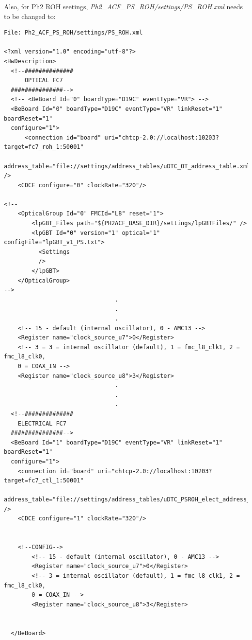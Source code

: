 \documentclass[10pt,a4paper]{article}
\begin{document}
\newpage

Also, for Ph2 ROH seetings, \emph{Ph2\_ACF\_PS\_ROH/settings/PS\_ROH.xml} needs to be changed to:

\begin{framed}
\begin{verbatim}
File: Ph2_ACF_PS_ROH/settings/PS_ROH.xml

<?xml version="1.0" encoding="utf-8"?>
<HwDescription>
  <!--##############
      OPTICAL FC7
  ###############-->
  <!-- <BeBoard Id="0" boardType="D19C" eventType="VR"> -->
  <BeBoard Id="0" boardType="D19C" eventType="VR" linkReset="1" boardReset="1"
  configure="1">
      <connection id="board" uri="chtcp-2.0://localhost:10203?target=fc7_roh_1:50001" 
      address_table="file://settings/address_tables/uDTC_OT_address_table.xml" />
    <CDCE configure="0" clockRate="320"/>

<!--
    <OpticalGroup Id="0" FMCId="L8" reset="1">
        <lpGBT_Files path="${PH2ACF_BASE_DIR}/settings/lpGBTFiles/" />
        <lpGBT Id="0" version="1" optical="1" configFile="lpGBT_v1_PS.txt">
          <Settings
          />
        </lpGBT>
    </OpticalGroup>
-->
                                .
                                .
                                .                                
    <!-- 15 - default (internal oscillator), 0 - AMC13 -->
    <Register name="clock_source_u7">0</Register>
    <!-- 3 = 3 = internal oscillator (default), 1 = fmc_l8_clk1, 2 = fmc_l8_clk0, 
    0 = COAX_IN -->
    <Register name="clock_source_u8">3</Register>   
                                .
                                .
                                .
  <!--##############
    ELECTRICAL FC7
  ###############-->
  <BeBoard Id="1" boardType="D19C" eventType="VR" linkReset="1" boardReset="1" 
  configure="1">
    <connection id="board" uri="chtcp-2.0://localhost:10203?target=fc7_ctl_1:50001" 
    address_table="file://settings/address_tables/uDTC_PSROH_elect_address_table.xml" />
    <CDCE configure="1" clockRate="320"/>


    <!--CONFIG-->
        <!-- 15 - default (internal oscillator), 0 - AMC13 -->
        <Register name="clock_source_u7">0</Register>
        <!-- 3 = internal oscillator (default), 1 = fmc_l8_clk1, 2 = fmc_l8_clk0,
        0 = COAX_IN -->
        <Register name="clock_source_u8">3</Register>


  </BeBoard>


\end{verbatim}
\end{framed}
\end{document}
